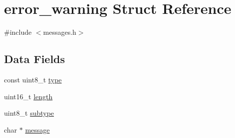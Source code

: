 \hypertarget{structerror__warning}{
\section{error\_\-warning Struct Reference}
\label{structerror__warning}
}


{\ttfamily \#include $<$messages.h$>$}

\subsection*{Data Fields}
\begin{DoxyCompactItemize}
\item 
const uint8\_\-t \hyperlink{structerror__warning_aca7dafb0092715a03dd40f45fc607f2a}{type}
\item 
uint16\_\-t \hyperlink{structerror__warning_a1892eba2086d12ac2b09005aeb09ea3b}{length}
\item 
uint8\_\-t \hyperlink{structerror__warning_a8613e2fef78de5c8994bc1b1ce55dc2f}{subtype}
\item 
char $\ast$ \hyperlink{structerror__warning_a0b2e8c7f76df48129f994ecc46d5c66c}{message}
\end{DoxyCompactItemize}


